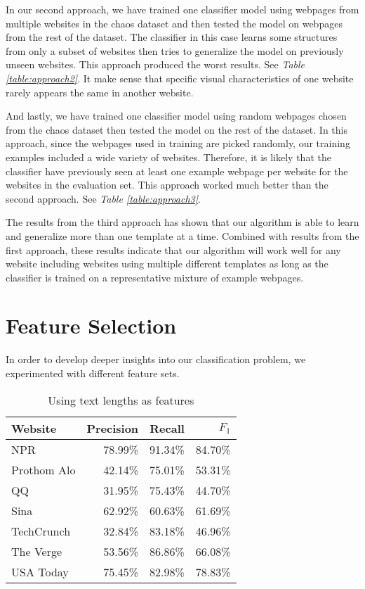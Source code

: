 \documentclass{acm_proc_article-sp}
\begin{document}
In our second approach, we have trained one classifier model using webpages from multiple websites in the chaos dataset and then tested the model on webpages from the rest of the dataset. The classifier in this case learns some structures from only a subset of websites then tries to generalize the model on previously unseen websites. This approach produced the worst results. See \emph{Table \ref{table:approach2}}. It make sense that specific visual characteristics of one website rarely appears the same in another website.

And lastly, we have trained one classifier model using random webpages chosen from the chaos dataset then tested the model on the rest of the dataset. In this approach, since the webpages used in training are picked randomly, our training examples included a wide variety of websites. Therefore, it is likely that the classifier have previously seen at least one example webpage per website for the websites in the evaluation set. This approach worked much better than the second approach. See \emph{Table \ref{table:approach3}}.

The results from the third approach has shown that our algorithm is able to learn and generalize more than one template at a time. Combined with results from the first approach, these results indicate that our algorithm will work well for any website including websites using multiple different templates as long as the classifier is trained on a representative mixture of example webpages.


\section{Feature Selection}

In order to develop deeper insights into our classification problem, we experimented with different feature sets.


\begin{table}
\centering
\caption{\label{table:textlength}Using text lengths as features}
\begin{tabular}{|l|r|r|r|} \hline
Website&Precision&Recall&$F_1$\\ \hline\hline
NPR&78.99\%&91.34\%&84.70\%\\ \hline
Prothom Alo&42.14\%&75.01\%&53.31\%\\ \hline
QQ&31.95\%&75.43\%&44.70\%\\ \hline
Sina&62.92\%&60.63\%&61.69\%\\ \hline
TechCrunch&32.84\%&83.18\%&46.96\%\\ \hline
The Verge&53.56\%&86.86\%&66.08\%\\ \hline
USA Today&75.45\%&82.98\%&78.83\%\\ \hline
\end{tabular}
\end{table}
\end{document}
